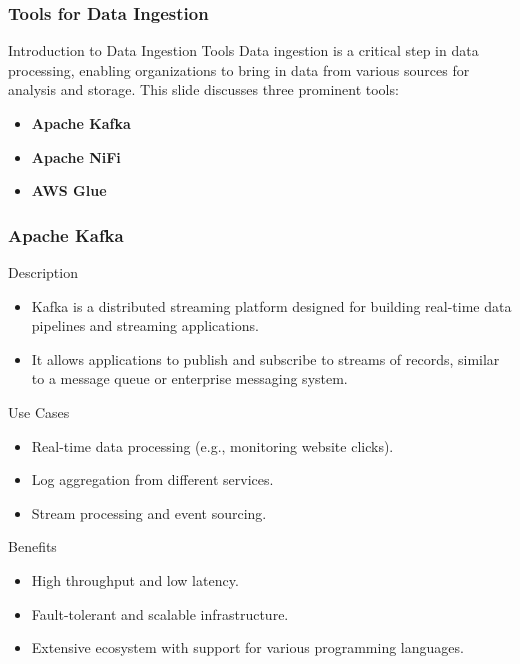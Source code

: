 \documentclass{beamer}
\begin{document}
\begin{frame}[fragile]
    \frametitle{Tools for Data Ingestion}
    \begin{block}{Introduction to Data Ingestion Tools}
        Data ingestion is a critical step in data processing, enabling organizations to bring in data from various sources for analysis and storage. 
        This slide discusses three prominent tools:
        \begin{itemize}
            \item \textbf{Apache Kafka}
            \item \textbf{Apache NiFi}
            \item \textbf{AWS Glue}
        \end{itemize}
    \end{block}
\end{frame}

\begin{frame}[fragile]
    \frametitle{Apache Kafka}
    \begin{block}{Description}
        \begin{itemize}
            \item Kafka is a distributed streaming platform designed for building real-time data pipelines and streaming applications.
            \item It allows applications to publish and subscribe to streams of records, similar to a message queue or enterprise messaging system.
        \end{itemize}
    \end{block}
    
    \begin{block}{Use Cases}
        \begin{itemize}
            \item Real-time data processing (e.g., monitoring website clicks).
            \item Log aggregation from different services.
            \item Stream processing and event sourcing.
        \end{itemize}
    \end{block}
    
    \begin{block}{Benefits}
        \begin{itemize}
            \item High throughput and low latency.
            \item Fault-tolerant and scalable infrastructure.
            \item Extensive ecosystem with support for various programming languages.
        \end{itemize}
    \end{block}
\end{frame}
\end{document}
